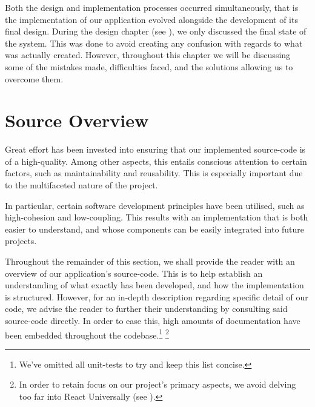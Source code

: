\documentclass{standalone}
\begin{document}
	Both the design and implementation processes occurred simultaneously, that is the implementation of our application evolved alongside the development of its final design. During the design chapter (see ), we only discussed the final state of the system. This was done to avoid creating any confusion with regards to what was actually created. However, throughout this chapter we will be discussing some of the mistakes made, difficulties faced, and the solutions allowing us to overcome them.

	\section{Source Overview}
		Great effort has been invested into ensuring that our implemented source-code is of a high-quality. Among other aspects, this entails conscious attention to certain factors, such as maintainability and reusability. This is especially important due to the multifaceted nature of the project.

		In particular, certain software development principles have been utilised, such as high-cohesion and low-coupling. This results with an implementation that is both easier to understand, and whose components can be easily integrated into future projects.

		Throughout the remainder of this section, we shall provide the reader with an overview of our application's source-code. This is to help establish an understanding of what exactly has been developed, and how the implementation is structured. However, for an in-depth description regarding specific detail of our code, we advise the reader to further their understanding by consulting said source-code directly. In order to ease this, high amounts of documentation have been embedded throughout the codebase.\footnote{We've omitted all unit-tests to try and keep this list concise.} \footnote{In order to retain focus on our project's primary aspects, we avoid delving too far into React Universally (see ).}
\end{document}
